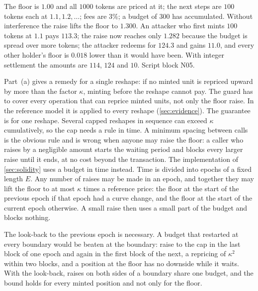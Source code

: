 \begin{example}
The floor is $1.00$ and all $1000$ tokens are priced at it; the next steps are $100$ tokens each at $1.1,1.2,\dots$; fees are $3\%$; a budget of $300$ has accumulated. Without interference the raise lifts the floor to $1.300$. An attacker who first mints $100$ tokens at $1.1$ pays $113.3$; the raise now reaches only $1.282$ because the budget is spread over more tokens; the attacker redeems for $124.3$ and gains $11.0$, and every other holder's floor is $0.018$ lower than it would have been. With integer settlement the amounts are $114$, $124$ and $10$. Script block N05.
\end{example}

Part~(a) gives a remedy for a single reshape: if no minted unit is repriced upward by more than the factor $\kappa$, minting before the reshape cannot pay. The guard has to cover every operation that can reprice minted units, not only the floor raise. In the reference model it is applied to every reshape (\cref{sec:evidence}). The guarantee is for one reshape. Several capped reshapes in sequence can exceed $\kappa$ cumulatively, so the cap needs a rule in time. A minimum spacing between calls is the obvious rule and is wrong when anyone may raise the floor: a caller who raises by a negligible amount starts the waiting period and blocks every larger raise until it ends, at no cost beyond the transaction. The implementation of \cref{sec:solidity} uses a budget in time instead. Time is divided into epochs of a fixed length $E$. Any number of raises may be made in an epoch, and together they may lift the floor to at most $\kappa$ times a reference price: the floor at the start of the previous epoch if that epoch had a curve change, and the floor at the start of the current epoch otherwise. A small raise then uses a small part of the budget and blocks nothing.

The look-back to the previous epoch is necessary. A budget that restarted at every boundary would be beaten at the boundary: raise to the cap in the last block of one epoch and again in the first block of the next, a repricing of $\kappa^2$ within two blocks, and a position at the floor has no downside while it waits. With the look-back, raises on both sides of a boundary share one budget, and the bound holds for every minted position and not only for the floor.

